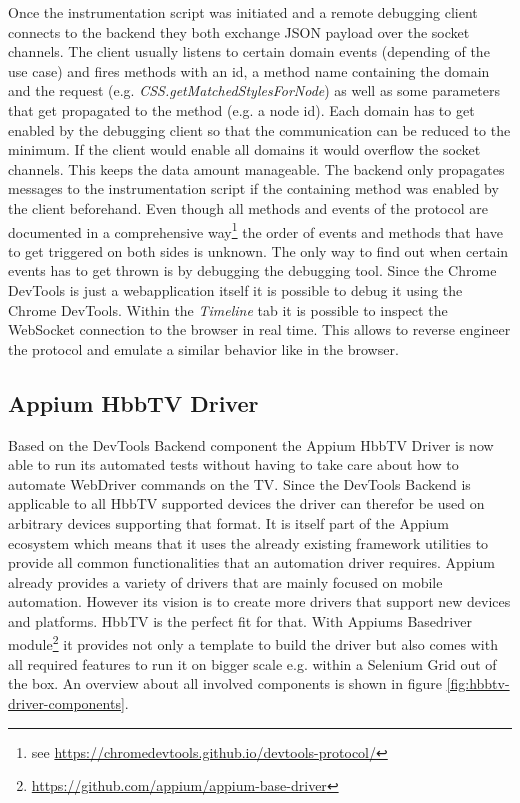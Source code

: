 Once the instrumentation script was initiated and a remote debugging client connects to the backend
they both exchange JSON payload over the socket channels. The client usually listens to certain
domain events (depending of the use case) and fires methods with an id, a method name containing
the domain and the request (e.g. \textit{CSS.getMatchedStylesForNode}) as well as some parameters
that get propagated to the method (e.g. a node id). Each domain has to get enabled by the debugging
client so that the communication can be reduced to the minimum. If the client would enable all
domains it would overflow the socket channels. This keeps the data amount manageable. The backend
only propagates messages to the instrumentation script if the containing method was enabled by
the client beforehand. Even though all methods and events of the protocol are documented in a
comprehensive way\footnote{see \url{https://chromedevtools.github.io/devtools-protocol/}} the order
of events and methods that have to get triggered on both sides is unknown. The only way to find
out when certain events has to get thrown is by debugging the debugging tool. Since the Chrome
DevTools is just a webapplication itself it is possible to debug it using the Chrome DevTools.
Within the \textit{Timeline} tab it is possible to inspect the WebSocket connection to the browser
in real time. This allows to reverse engineer the protocol and emulate a similar behavior like
in the browser.

\subsection{Appium HbbTV Driver\label{sec:appiumhbbtvdriver}}

Based on the DevTools Backend component the Appium HbbTV Driver is now able to run its automated
tests without having to take care about how to automate WebDriver commands on the TV. Since the
DevTools Backend is applicable to all HbbTV supported devices the driver can therefor be used on
arbitrary devices supporting that format. It is itself part of the Appium ecosystem which means
that it uses the already existing framework utilities to provide all common functionalities that
an automation driver requires. Appium already provides a variety of drivers that are mainly
focused on mobile automation. However its vision is to create more drivers that support new devices
and platforms. HbbTV is the perfect fit for that. With Appiums Basedriver module\footnote{\url{https://github.com/appium/appium-base-driver}}
it provides not only a template to build the driver but also comes with all required features to
run it on bigger scale e.g. within a Selenium Grid out of the box. An overview about all involved
components is shown in figure \ref{fig:hbbtv-driver-components}.


